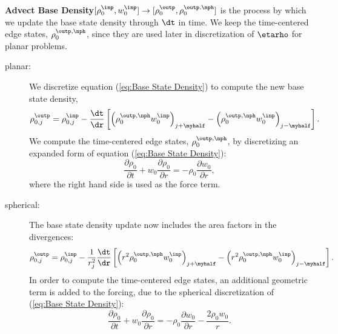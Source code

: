 {\bf Advect Base Density}$[\rho_0^\inp,w_0^\inp] \rightarrow
  [\rho_0^\outp, \rho_0^{\outp,\nph}]$ is the process by which we
  update the base state density through $\dt$ in time.  We keep the
  time-centered edge states, $\rho_0^{\outp,\nph}$,
  since they are used later in discretization of $\etarho$ for planar problems.
\begin{description}
\item[planar:] We discretize equation (\ref{eq:Base State Density}) to
  compute the new base state density,
\begin{equation}
\rho_{0,j}^{\outp} = \rho_{0,j}^{\inp} - \frac{\dt}{\dr} \left [ \left( \rho_0^{\outp,\nph} w_0^{\inp}\right)_{j+\myhalf} - \left( \rho_0^{\outp,\nph} w_0^{\inp}\right)_{j-\myhalf} \right ].
\end{equation}
  We compute the time-centered edge states, $\rho_0^{\outp,\nph}$,
  by discretizing an expanded form of equation (\ref{eq:Base State Density}):
\begin{equation}
\frac{\partial \rho_0}{\partial t} + w_0 \frac{\partial \rho_0}{\partial r} = - \rho_0 \frac{\partial w_0}{\partial r},
\end{equation}
  where the right hand side is used as the force term.
\item[spherical:] The base state density update now includes the area factors in the 
  divergences:
\begin{equation}
\rho_{0,j}^{\outp} = \rho_{0,j}^{\inp} - \frac{1}{r_j^2} \frac{\dt}{\dr} \left [ \left( r^2 \rho_0^{\outp,\nph} w_0^{\inp}\right)_{j+\myhalf} - \left( r^2 \rho_0^{\outp,\nph} w_0^{\inp}\right)_{j-\myhalf} \right].
\end{equation}
  In order to compute the time-centered edge states, an additional geometric 
  term is added to the forcing, due to the spherical discretization of 
  (\ref{eq:Base State Density}):
\begin{equation}
\frac{\partial \rho_0}{\partial t} + w_0 \frac{\partial \rho_0}{\partial r} = - \rho_0 \frac{\partial w_0}{\partial r} - \frac{2 \rho_0 w_0}{r}.
\end{equation}
\end{description}

